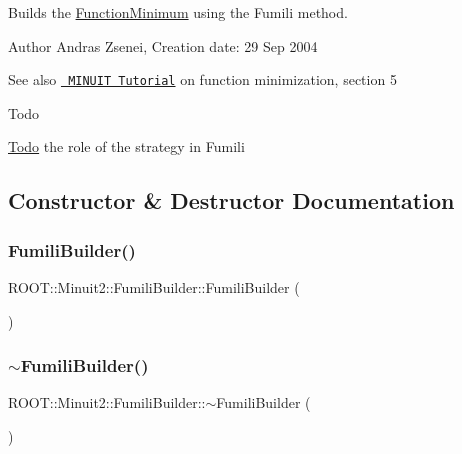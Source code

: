 Builds the \mbox{\hyperlink{classROOT_1_1Minuit2_1_1FunctionMinimum}{Function\+Minimum}} using the Fumili method.

\begin{DoxyAuthor}{Author}
Andras Zsenei, Creation date\+: 29 Sep 2004
\end{DoxyAuthor}
\begin{DoxySeeAlso}{See also}
\href{http://www.cern.ch/winkler/minuit/tutorial/mntutorial.pdf}{\texttt{ M\+I\+N\+U\+IT Tutorial}} on function minimization, section 5
\end{DoxySeeAlso}
\begin{DoxyRefDesc}{Todo}
\item[\mbox{\hyperlink{todo__todo000026}{Todo}}]the role of the strategy in Fumili\end{DoxyRefDesc}


\subsection{Constructor \& Destructor Documentation}
\mbox{\label{classROOT_1_1Minuit2_1_1FumiliBuilder_a79c7807308c680ea2e42829171ebe8c1}} 
\subsubsection{\texorpdfstring{FumiliBuilder()}{FumiliBuilder()}\hspace{0.1cm}{\footnotesize\ttfamily [1/3]}}
{\footnotesize\ttfamily R\+O\+O\+T\+::\+Minuit2\+::\+Fumili\+Builder\+::\+Fumili\+Builder (\begin{DoxyParamCaption}{ }\end{DoxyParamCaption})\hspace{0.3cm}{\ttfamily [inline]}}

\mbox{\label{classROOT_1_1Minuit2_1_1FumiliBuilder_a1de07586a1617732f49d59df92c44006}} 
\subsubsection{\texorpdfstring{$\sim$FumiliBuilder()}{~FumiliBuilder()}\hspace{0.1cm}{\footnotesize\ttfamily [1/3]}}
{\footnotesize\ttfamily R\+O\+O\+T\+::\+Minuit2\+::\+Fumili\+Builder\+::$\sim$\+Fumili\+Builder (\begin{DoxyParamCaption}{ }\end{DoxyParamCaption})\hspace{0.3cm}{\ttfamily [inline]}}

